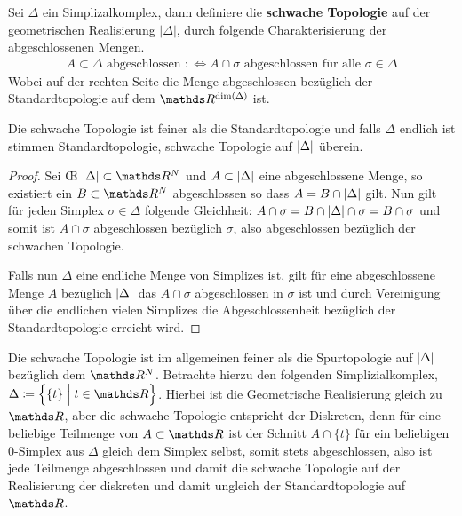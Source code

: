 \begin{Def}
  Sei $\Delta$ ein Simplizalkomplex, dann definiere die
  \textbf{schwache Topologie} auf der geometrischen Realisierung $| \Delta |$,
  durch folgende Charakterisierung der abgeschlossenen Mengen.
  \begin{gather*}
    A \subset \Delta \text{ abgeschlossen } :\Leftrightarrow A \cap
    \sigma \text{ abgeschlossen für alle } \sigma \in \Delta
  \end{gather*}
  Wobei auf der rechten Seite die Menge abgeschlossen bezüglich der
  Standardtopologie auf dem $\R^{\dim(\Delta)}$ ist.
\end{Def}

\begin{Lem}
  Die schwache Topologie ist feiner als die Standardtopologie und
  falls $\Delta$ endlich ist stimmen Standardtopologie, schwache
  Topologie auf $\left| \Delta \right|$ überein.
  \begin{proof}
    Sei \OE\; $\gr{\Delta} \subset \R^N$ und $A \subset \left| \Delta \right|$
    eine abgeschlossene Menge, so existiert ein $B \subset \R^N$
    abgeschlossen so dass $A = B \cap \left| \Delta \right|$ gilt. Nun gilt für
    jeden Simplex $\sigma \in \Delta$ folgende Gleichheit:
    $A \cap \sigma = B \cap \left| \Delta \right| \cap \sigma = B \cap \sigma$
    und somit ist $A \cap \sigma$ abgeschlossen bezüglich $\sigma$,
    also abgeschlossen bezüglich der schwachen Topologie.

    Falls nun $\Delta$ eine endliche Menge von Simplizes ist, gilt für
    eine abgeschlossene Menge $A$ bezüglich $\left| \Delta \right|$ das
    $A \cap \sigma$ abgeschlossen in $\sigma$ ist und durch
    Vereinigung über die endlichen vielen Simplizes die
    Abgeschlossenheit bezüglich der Standardtopologie erreicht wird.
  \end{proof}
\end{Lem}

\begin{Bem}
  Die schwache Topologie ist im allgemeinen feiner als die
  Spurtopologie auf $\left| \Delta \right|$ bezüglich dem $\R^N$. Betrachte
  hierzu den folgenden Simplizialkomplex,
  $\Delta \coloneqq \set{ \{t\} }{t \in \R}$.  Hierbei ist die
  Geometrische Realisierung gleich zu $\R$, aber die schwache
  Topologie entspricht der Diskreten, denn für eine beliebige
  Teilmenge von $A \subset \R$ ist der Schnitt $A \cap \{ t \}$ für
  ein beliebigen $0$-Simplex aus $\Delta$ gleich dem Simplex selbst,
  somit stets abgeschlossen, also ist jede Teilmenge abgeschlossen und
  damit die schwache Topologie auf der Realisierung der diskreten und
  damit ungleich der Standardtopologie auf $\R$.
\end{Bem}



